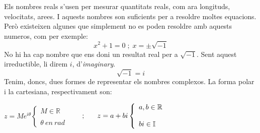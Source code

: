 {
}
Els nombres reals s'usen per mesurar quantitats reals, com ara longituds, velocitats, arees. I aquests nombres son suficients per a resoldre moltes equacions. Però existeixen algunes que simplement no es poden resoldre amb aquests numeros, com per exemple:
\[x^2 + 1 = 0 \; ; \; x = \pm\sqrt{-1}\]
No hi ha cap nombre que ens doni un resultat real per a \(\sqrt{-1}\). Sent aquest irreductible, li direm $i$, d'\textit{imaginary}.
\[\sqrt{-1} = i\]
Tenim, doncs, dues formes de representar els nombres complexos. La forma polar i la cartesiana, respectivament son: \newline \newline
\centerline{
\(
z = Me^{i\theta}
\left\{ \begin{array}{lcc}
        M \in \mathbb{R} \\
        \\ \theta \: en \: rad
         \end{array}
\right.\)
\(
\hspace*{6mm} ; \hspace*{6mm}
    z = a + bi
    \left\{ \begin{array}{lcc}
            a, b \in \mathbb{R}\\
            \\ bi \in \mathbb{I}
             \end{array}
   \right.
\)
}
